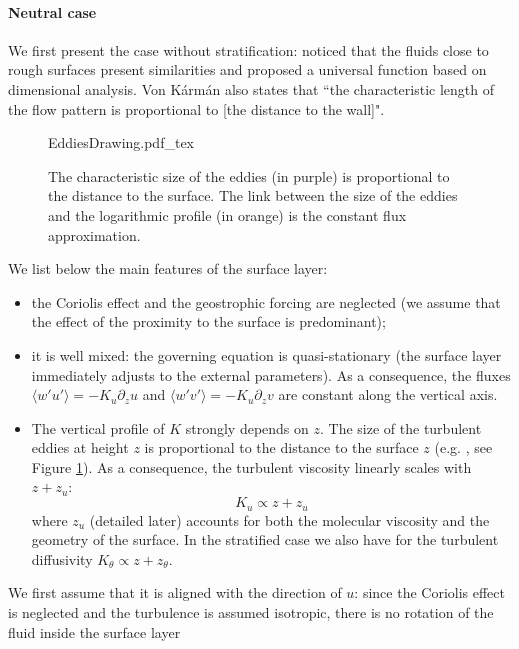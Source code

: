 \paragraph{Neutral case}
We first present the case without stratification:
\citep{karman_mechanische_1930} noticed that the
fluids close to rough surfaces present similarities and
proposed a universal function based on dimensional analysis.
Von K\'arm\'an also states that ``the characteristic length
of the flow pattern is proportional to
[the distance to the wall]".
\par
\begin{figure}[h!]
	\centering
	{EddiesDrawing.pdf_tex}
	\caption{The characteristic size of the eddies
	(in purple) is proportional to the distance to the
	surface. The link between the size of the eddies
	and the logarithmic profile (in orange) is
	the constant flux approximation.
	}
	\label{fig:airseaSCM_eddiesDrawing}
\end{figure}
We list below the main features of the surface layer:
\begin{itemize}
	\item the Coriolis effect and the geostrophic forcing are
		neglected (we assume that the effect of the
		proximity to the surface is predominant);
	\item it is well mixed: the governing equation
		is quasi-stationary (the surface layer
		immediately adjusts to the external parameters).
		As a consequence, the fluxes
		$\langle w'u'\rangle = -K_u \partial_z u$
		and
		$\langle w'v'\rangle = -K_u \partial_z v$
		are constant along the vertical axis.
	\item The vertical profile of $K$ strongly depends 
		on $z$.
		The size of the turbulent eddies at height $z$
		is proportional to the distance to the surface $z$
		(e.g. \cite{kawai_wall-modeling_2012}, see Figure
		\ref{fig:airseaSCM_eddiesDrawing}).
		As a consequence, the turbulent viscosity
		linearly scales with $z+z_u$:
		\begin{equation}
			K_u \propto z+z_u
		\end{equation}
		where $z_u$ (detailed later) accounts for both the
		molecular viscosity and the geometry of the surface.
		In the stratified case we also have for the turbulent
		diffusivity $K_\theta \propto z+z_\theta$.
\end{itemize}
We first assume that it is aligned with the
direction of $u$: since the Coriolis effect
is neglected and the turbulence is assumed isotropic,
there is no rotation of the fluid inside the surface layer
